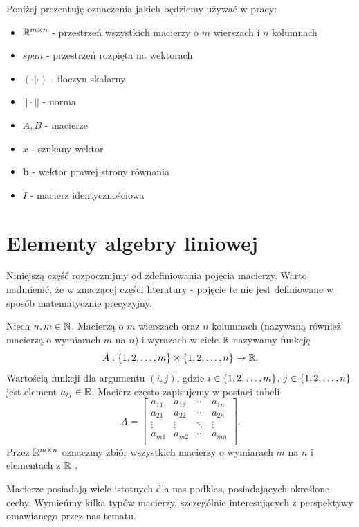 \documentclass[12pt,a4paper]{report}
\newcommand{\vr}[1]{\mathbf{#1}}
\newcommand{\mx}[1]{{#1}}
\begin{document}
Poniżej prezentuję oznaczenia jakich będziemy używać w pracy: 
\begin{itemize}
\item$\mathbb{R}^{m \times n}$ - przestrzeń wszystkich macierzy o $m$ wierszach i $n$ kolumnach
\item$span$ - przestrzeń rozpięta na wektorach
\item$(\cdot |\cdot )$ - iloczyn skalarny
\item$||\cdot || $ - norma
\item$\mx{A}, \mx{B}$ - macierze
\item$x$ - szukany wektor
\item$\vr{b}$ - wektor prawej strony równania
\item$\mx{I}$ - macierz identycznościowa

\end{itemize}

\section{Elementy algebry liniowej} 

Niniejszą część rozpocznijmy od zdefiniowania pojęcia macierzy. Warto nadmienić, że w znaczącej części literatury - pojęcie te nie jest definiowane w sposób matematycznie precyzyjny.

\begin{definition}
Niech $n,m \in \mathbb{N}$. Macierzą o $m$ wierszach oraz $n$ kolumnach (nazywaną również macierzą o wymiarach $m$ na $n$) i wyrazach w ciele $\mathbb{R}$ nazywamy funkcję 
$$
\mx{A}: \set{1,2, \ldots ,m}\times \set{1,2, \ldots ,n} \to \setR.
$$
Wartością funkcji dla argumentu $(i,j)$, gdzie $i \in \left\lbrace {1,2, \ldots ,m} \right\rbrace$, $j \in \left\lbrace {1,2, \ldots ,n} \right\rbrace$ jest element $a_{ij} \in \mathbb{R}$. Macierz często zapisujemy w postaci tabeli
$$
\mx{A} = \begin{bmatrix}
 a_{11} & a_{12} & \cdots & a_{1n} \\
         a_{21} & a_{22} & \cdots & a_{2n} \\
         \vdots & \vdots & \ddots & \vdots \\
         a_{m1} & a_{m2} & \cdots & a_{mn} \\
\end{bmatrix}.
$$
Przez $\mathbb{R}^{m \times n}$ oznaczmy zbiór wszystkich macierzy o wymiarach $m$ na $n$ i elementach z $\mathbb{R}$ .
\end{definition}

Macierze posiadają wiele istotnych dla nas podklas, posiadających określone cechy. Wymieńmy kilka typów macierzy, szczególnie interesujących z perspektywy omawianego przez nas tematu.
\end{document}
